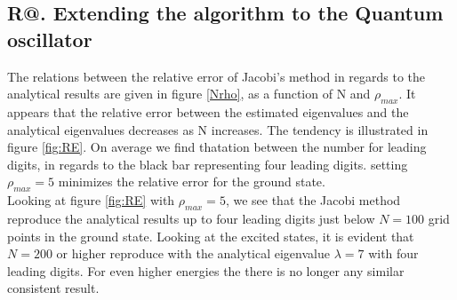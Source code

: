 \documentclass[%
reprint,
amsmath,amssymb,
aps,
]{revtex4-1}
\makeatletter
\newcommand*{\rom}[1]{\expandafter\@slowromancap\romannumeral #1@}
\makeatother
\begin{document}
\subsection*{R\rom{2}. Extending the algorithm to the Quantum oscillator} \noindent 
The relations between the relative error of Jacobi's method in regards to the analytical results are given in figure \ref{Nrho}, as a function of N and $\rho_{max}$. It appears that the relative error between the estimated eigenvalues and the analytical eigenvalues decreases as N increases. The tendency is illustrated in figure \ref{fig:RE}. On average we find thatation between the number for leading digits, in regards to the black bar representing four leading digits. setting $\rho_{max} = 5$ minimizes the relative error for the ground state. \\
Looking at figure \ref{fig:RE} with $\rho_{max} = 5$, we see that the Jacobi method reproduce the analytical results up to four leading digits just below $N=100$ grid points in the ground state. Looking at the excited states, it is evident that $N=200$  or higher reproduce with the analytical eigenvalue $\lambda = 7$ with four leading digits. For even higher energies the there is no longer any similar consistent result. \\
\end{document}
